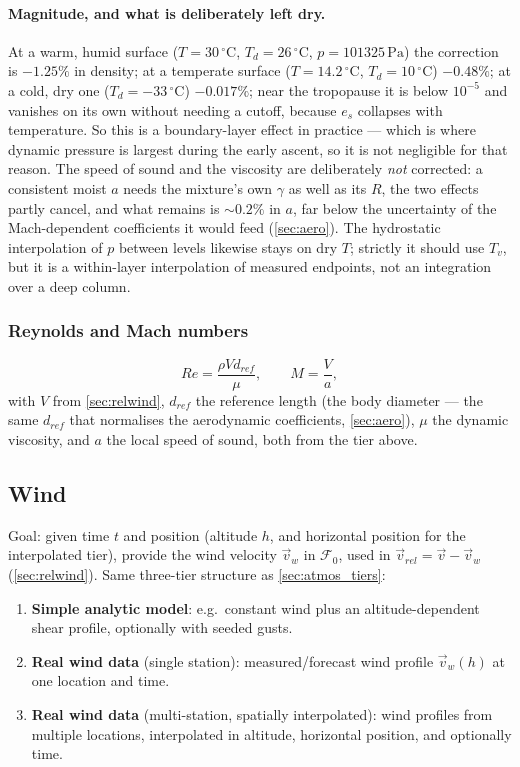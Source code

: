 \paragraph{Magnitude, and what is deliberately left dry.} At a warm, humid surface
($T=30\,^\circ\mathrm{C}$, $T_d=26\,^\circ\mathrm{C}$, $p=101325\,\mathrm{Pa}$) the correction is
$-1.25\%$ in density; at a temperate surface ($T=14.2\,^\circ\mathrm{C}$, $T_d=10\,^\circ\mathrm{C}$)
$-0.48\%$; at a cold, dry one ($T_d=-33\,^\circ\mathrm{C}$) $-0.017\%$; near the tropopause it is
below $10^{-5}$ and vanishes on its own without needing a cutoff, because $e_s$ collapses with
temperature. So this is a boundary-layer effect in practice --- which is where dynamic pressure is
largest during the early ascent, so it is not negligible for that reason. The speed of sound and
the viscosity are deliberately \emph{not} corrected: a consistent moist $a$ needs the mixture's own
$\gamma$ as well as its $R$, the two effects partly cancel, and what remains is $\sim0.2\%$ in $a$,
far below the uncertainty of the Mach-dependent coefficients it would feed
(\autoref{sec:aero}). The hydrostatic interpolation of $p$ between levels likewise stays on dry
$T$; strictly it should use $T_v$, but it is a within-layer interpolation of measured endpoints,
not an integration over a deep column.

\subsubsection{Reynolds and Mach numbers}\label{sec:reynolds_mach}
\begin{equation}
    Re = \frac{\rho V d_{ref}}{\mu}, \qquad M = \frac{V}{a},
\end{equation}
with $V$ from \autoref{sec:relwind}, $d_{ref}$ the reference length (the body diameter --- the
same $d_{ref}$ that normalises the aerodynamic coefficients, \autoref{sec:aero}), $\mu$ the
dynamic viscosity, and $a$ the local speed of sound, both from the tier above.

\subsection{Wind}\label{sec:wind}
Goal: given time $t$ and position (altitude $h$, and horizontal position for the interpolated
tier), provide the wind velocity $\vec{v}_w$ in $\mathcal{F}_0$, used in
$\vec{v}_{rel} = \vec{v} - \vec{v}_w$ (\autoref{sec:relwind}). Same three-tier structure as
\autoref{sec:atmos_tiers}:
\begin{enumerate}
    \item \textbf{Simple analytic model}: e.g.\ constant wind plus an altitude-dependent shear
    profile, optionally with seeded gusts.
    \item \textbf{Real wind data} (single station): measured/forecast wind profile $\vec{v}_w(h)$
    at one location and time.
    \item \textbf{Real wind data} (multi-station, spatially interpolated): wind profiles from
    multiple locations, interpolated in altitude, horizontal position, and optionally time.
\end{enumerate}

